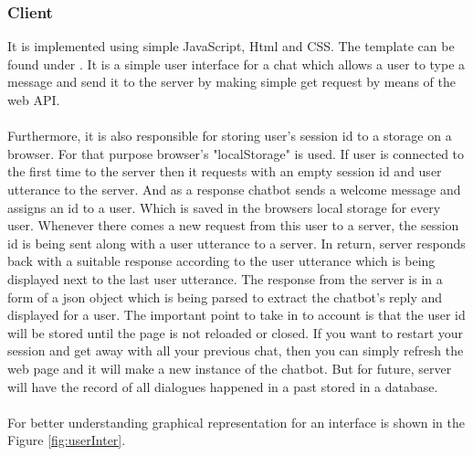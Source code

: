 \subsubsection*{Client}
It is implemented using simple JavaScript, Html and CSS. The template can be found under \cite{userinterface}. It is a simple user interface for a chat which allows a user to type a message and send it to the server by making simple get request by means of the web API. 
\\~\\
Furthermore, it is also responsible for storing user's session id to a storage on a browser. For that purpose browser's "localStorage" \cite{localstorage} is used. If user is connected to the first time to the server then it requests with an empty session id and user utterance to the server. And as a response chatbot sends a welcome message and assigns an id to a user. Which is saved in the browsers local storage for every user. Whenever there comes a new request from this user to a server, the session id is being sent along with a user utterance to a server. In return, server responds back with a suitable response according to the user utterance which is being displayed next to the last user utterance. The response from the server is in a form of a json object which is being parsed to extract the chatbot's reply and displayed for a user. The important point to take in to account is that the user id will be stored until the page is not reloaded or closed. If you want to restart your session and get away with all your previous chat, then you can simply refresh the web page and it will make a new instance of the chatbot. But for future, server will have the record of all dialogues happened in a past stored in a database. 
\\~\\
For better understanding graphical representation for an interface is shown in the Figure \ref{fig:userInter}.

